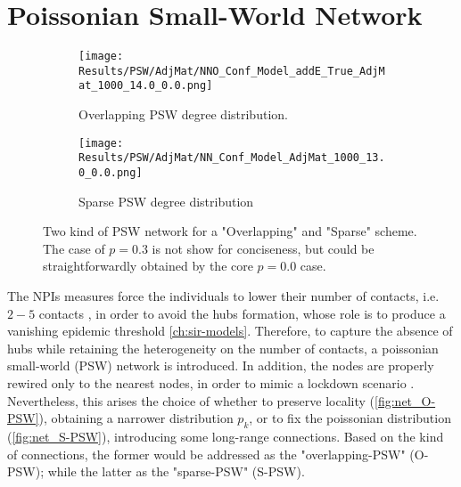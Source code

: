 \documentclass[a4paper,10pt,twoside]{book} %
\theoremstyle{definition}
\begin{document}
\clearpage
\section{Poissonian Small-World Network}
\begin{figure}[ht]
    \begin{subfigure}{.45\linewidth}
        \texttt{[image: Results/PSW/AdjMat/NNO\_Conf\_Model\_addE\_True\_AdjMat\_1000\_14.0\_0.0.png]}
        \centering
        \caption{Overlapping PSW degree distribution. }
        \label{fig:net_O-PSW}
    \end{subfigure}
	\hfill
	\begin{subfigure}{.45\linewidth}
        \texttt{[image: Results/PSW/AdjMat/NN\_Conf\_Model\_AdjMat\_1000\_13.0\_0.0.png]}
        \centering
        \caption{Sparse PSW degree distribution}
        \label{fig:net_S-PSW}
    \end{subfigure}
	\caption{Two kind of PSW network for a "Overlapping" and "Sparse" scheme. The case of $p = 0.3$ is not show for conciseness, but could be straightforwardly obtained by the core $p = 0.0$ case.}
\end{figure}
The NPIs measures force the individuals to lower their number of contacts, i.e. $2-5$ contacts \cite{Liu::2021_Review_SContactPattern}, in order to avoid the hubs formation, whose role is to produce a vanishing epidemic threshold \autoref{ch:sir-models}.
Therefore, to capture the absence of hubs while retaining the heterogeneity on the number of contacts, a poissonian small-world (PSW) network is introduced. In addition, the nodes are properly rewired only to the nearest nodes, in order to mimic a lockdown scenario \cite{Thurner::Appendix_NetBasedExpl}. Nevertheless, this arises the choice of whether to preserve locality (\autoref{fig:net_O-PSW}), obtaining a narrower distribution $p_k$, or to fix the poissonian distribution (\autoref{fig:net_S-PSW}), introducing some long-range connections. Based on the kind of connections, the former would be addressed as the "overlapping-PSW" (O-PSW); while the latter as the "sparse-PSW" (S-PSW). 
\end{document}
